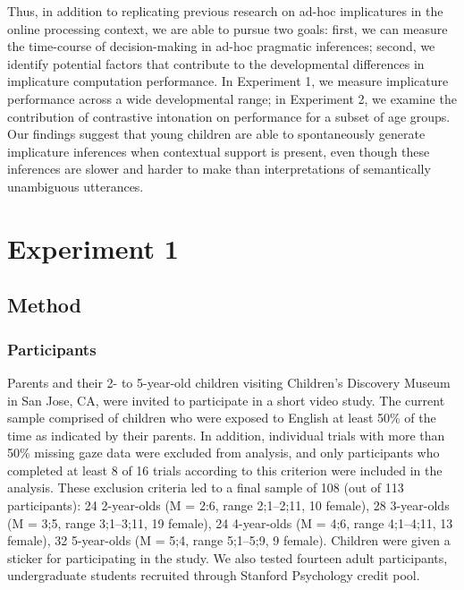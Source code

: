 \documentclass[10pt,letterpaper]{article}
\begin{document}
Thus, in addition to replicating previous research on ad-hoc implicatures in the online processing context, we are able to pursue two goals: first, we can measure the time-course of decision-making in ad-hoc pragmatic inferences; second, we identify potential factors that contribute to the developmental differences in implicature computation performance. In Experiment 1, we measure implicature performance across a wide developmental range; in Experiment 2, we examine the contribution of contrastive intonation on performance for a subset of age groups. Our findings suggest that young children are able to spontaneously generate implicature inferences when contextual support is present, even though these inferences are slower and harder to make than interpretations of semantically unambiguous utterances.

\section{Experiment 1}

\subsection{Method}

\subsubsection{Participants}

Parents and their 2- to 5-year-old children visiting Children's Discovery Museum in San Jose, CA, were invited to participate in a short video study. The current sample comprised of children who were exposed to English at least 50\% of the time as indicated by their parents. In addition, individual trials with more than 50\% missing gaze data were excluded from analysis, and only participants who completed at least 8 of 16 trials according to this criterion were included in the analysis. These exclusion criteria led to a final sample of 108 (out of 113 participants): 24 2-year-olds (M = 2:6, range 2;1--2;11, 10 female), 28 3-year-olds (M = 3;5, range 3;1--3;11, 19 female), 24 4-year-olds (M = 4;6, range 4;1--4;11, 13 female), 32 5-year-olds (M = 5;4, range 5;1--5;9, 9 female). Children were given a sticker for participating in the study. We also tested fourteen adult participants, undergraduate students recruited through Stanford Psychology credit pool.

\vspace{12pt}
\end{document}
